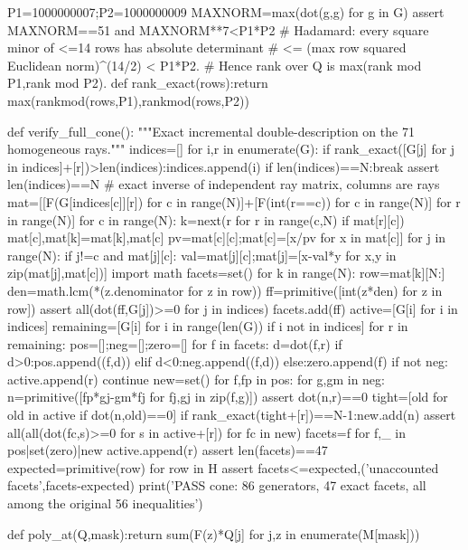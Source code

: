 \documentclass[UTF8,11pt,a4paper]{ctexart}
\begin{document}
\begin{CodeListing}
P1=1000000007;P2=1000000009
MAXNORM=max(dot(g,g) for g in G)
assert MAXNORM==51 and MAXNORM**7<P1*P2
# Hadamard: every square minor of <=14 rows has absolute determinant
# <= (max row squared Euclidean norm)^(14/2) < P1*P2.
# Hence rank over Q is max(rank mod P1,rank mod P2).
def rank_exact(rows):return max(rankmod(rows,P1),rankmod(rows,P2))


def verify_full_cone():
    """Exact incremental double-description on the 71 homogeneous rays."""
    indices=[]
    for i,r in enumerate(G):
        if rank_exact([G[j] for j in indices]+[r])>len(indices):indices.append(i)
        if len(indices)==N:break
    assert len(indices)==N
    # exact inverse of independent ray matrix, columns are rays
    mat=[[F(G[indices[c]][r]) for c in range(N)]+[F(int(r==c)) for c in range(N)] for r in range(N)]
    for c in range(N):
        k=next(r for r in range(c,N) if mat[r][c])
        mat[c],mat[k]=mat[k],mat[c]
        pv=mat[c][c];mat[c]=[x/pv for x in mat[c]]
        for j in range(N):
            if j!=c and mat[j][c]:
                val=mat[j][c];mat[j]=[x-val*y for x,y in zip(mat[j],mat[c])]
    import math
    facets=set()
    for k in range(N):
        row=mat[k][N:]
        den=math.lcm(*(z.denominator for z in row))
        ff=primitive([int(z*den) for z in row])
        assert all(dot(ff,G[j])>=0 for j in indices)
        facets.add(ff)
    active=[G[i] for i in indices]
    remaining=[G[i] for i in range(len(G)) if i not in indices]
    for r in remaining:
        pos=[];neg=[];zero=[]
        for f in facets:
            d=dot(f,r)
            if d>0:pos.append((f,d))
            elif d<0:neg.append((f,d))
            else:zero.append(f)
        if not neg:
            active.append(r)
            continue
        new=set()
        for f,fp in pos:
            for g,gm in neg:
                n=primitive([fp*gj-gm*fj for fj,gj in zip(f,g)])
                assert dot(n,r)==0
                tight=[old for old in active if dot(n,old)==0]
                if rank_exact(tight+[r])==N-1:new.add(n)
        assert all(all(dot(fc,s)>=0 for s in active+[r]) for fc in new)
        facets={f for f,_ in pos}|set(zero)|new
        active.append(r)
    assert len(facets)==47
    expected={primitive(row) for row in H}
    assert facets<=expected,('unaccounted facets',facets-expected)
    print('PASS cone: 86 generators, 47 exact facets, all among the original 56 inequalities')


def poly_at(Q,mask):return sum(F(z)*Q[j] for j,z in enumerate(M[mask]))



\end{CodeListing}
\end{document}

